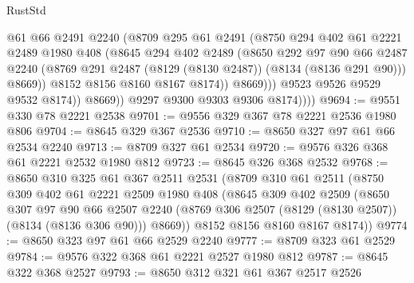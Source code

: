 \begin{lexlean}{RustStd}
\begin{coremodule}
{\begin{coremodule}
{{{{{{{{{{{{{{{{{{{{{{{{{{{{{{{{{{{{{{{{{{{{{{{{{{{{{                          @61
                          @66
                          @2491
                          @2240
                          (@8709
                            @295
                            @61
                            @2491
                            (@8750
                              @294
                              @402
                              @61
                              @2221
                              @2489
                              @1980
                              @408
                              (@8645
                                @294
                                @402
                                @2489
                                (@8650
                                  @292
                                  @97
                                  @90
                                  @66
                                  @2487
                                  @2240
                                  (@8769 @291 @2487 (@8129 (@8130 @2487)) (@8134 (@8136 @291 @90)))
                                  @8669))
                              @8152
                              @8156
                              @8160
                              @8167
                              @8174))
                          @8669)))
                    @9523
                    @9526
                    @9529
                    @9532
                    @8174))
                @8669))
            @9297
            @9300
            @9303
            @9306
            @8174))))
@9694 := @9551 @330 @78 @2221 @2538
@9701 := @9556 @329 @367 @78 @2221 @2536 @1980 @806
@9704 := @8645 @329 @367 @2536
@9710 := @8650 @327 @97 @61 @66 @2534 @2240
@9713 := @8709 @327 @61 @2534
@9720 := @9576 @326 @368 @61 @2221 @2532 @1980 @812
@9723 := @8645 @326 @368 @2532
@9768 := @8650
    @310
    @325
    @61
    @367
    @2511
    @2531
    (@8709
      @310
      @61
      @2511
      (@8750
        @309
        @402
        @61
        @2221
        @2509
        @1980
        @408
        (@8645
          @309
          @402
          @2509
          (@8650
            @307
            @97
            @90
            @66
            @2507
            @2240
            (@8769 @306 @2507 (@8129 (@8130 @2507)) (@8134 (@8136 @306 @90)))
            @8669))
        @8152
        @8156
        @8160
        @8167
        @8174))
@9774 := @8650 @323 @97 @61 @66 @2529 @2240
@9777 := @8709 @323 @61 @2529
@9784 := @9576 @322 @368 @61 @2221 @2527 @1980 @812
@9787 := @8645 @322 @368 @2527
@9793 := @8650 @312 @321 @61 @367 @2517 @2526
}}}}}}}}}}}}}}}}}}}}}}}}}}}}}}}}}}}}}}}}}}}}}}}}}}}}}
\end{coremodule}}
\end{coremodule}
\end{lexlean}
